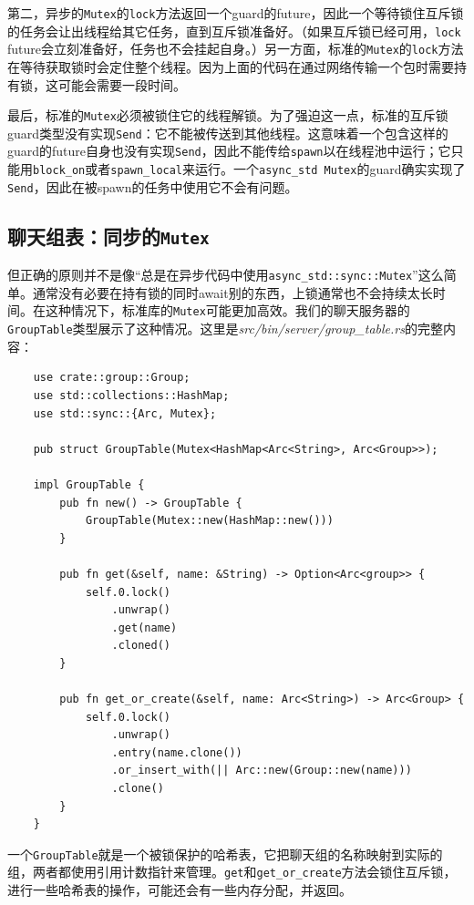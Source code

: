 第二，异步的\texttt{Mutex}的\texttt{lock}方法返回一个guard的future，因此一个等待锁住互斥锁的任务会让出线程给其它任务，直到互斥锁准备好。（如果互斥锁已经可用，\texttt{lock} future会立刻准备好，任务也不会挂起自身。）另一方面，标准的\texttt{Mutex}的\texttt{lock}方法在等待获取锁时会定住整个线程。因为上面的代码在通过网络传输一个包时需要持有锁，这可能会需要一段时间。

最后，标准的\texttt{Mutex}必须被锁住它的线程解锁。为了强迫这一点，标准的互斥锁guard类型没有实现\texttt{Send}：它不能被传送到其他线程。这意味着一个包含这样的guard的future自身也没有实现\texttt{Send}，因此不能传给\texttt{spawn}以在线程池中运行；它只能用\texttt{block\_on}或者\texttt{spawn\_local}来运行。一个\texttt{async\_std Mutex}的guard确实实现了\texttt{Send}，因此在被spawn的任务中使用它不会有问题。

\subsection{聊天组表：同步的\texttt{Mutex}}
但正确的原则并不是像“总是在异步代码中使用\texttt{async\_std::sync::Mutex}”这么简单。通常没有必要在持有锁的同时await别的东西，上锁通常也不会持续太长时间。在这种情况下，标准库的\texttt{Mutex}可能更加高效。我们的聊天服务器的\texttt{GroupTable}类型展示了这种情况。这里是\emph{src/bin/server/group\_table.rs}的完整内容：
\begin{verbatim}
    use crate::group::Group;
    use std::collections::HashMap;
    use std::sync::{Arc, Mutex};

    pub struct GroupTable(Mutex<HashMap<Arc<String>, Arc<Group>>);

    impl GroupTable {
        pub fn new() -> GroupTable {
            GroupTable(Mutex::new(HashMap::new()))
        }

        pub fn get(&self, name: &String) -> Option<Arc<group>> {
            self.0.lock()
                .unwrap()
                .get(name)
                .cloned()
        }

        pub fn get_or_create(&self, name: Arc<String>) -> Arc<Group> {
            self.0.lock()
                .unwrap()
                .entry(name.clone())
                .or_insert_with(|| Arc::new(Group::new(name)))
                .clone()
        }
    }
\end{verbatim}

一个\texttt{GroupTable}就是一个被锁保护的哈希表，它把聊天组的名称映射到实际的组，两者都使用引用计数指针来管理。\texttt{get}和\texttt{get\_or\_create}方法会锁住互斥锁，进行一些哈希表的操作，可能还会有一些内存分配，并返回。

